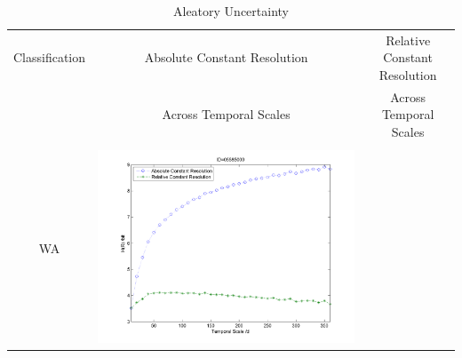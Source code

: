 \documentclass[11pt]{article}
\begin{document}
\begin{table}[H]\small
\caption{Aleatory Uncertainty}
\resizebox{\textwidth}{!}
{
\centering
\begin{tabular}{ccc}
\toprule
Classification& Absolute Constant Resolution & Relative Constant Resolution \\
& Across Temporal Scales & Across Temporal Scales\\\hline
\\
WA
&\begin{minipage}{.6\textwidth}\includegraphics[width=\linewidth]{resultgraph/e05585000.png}\end{minipage}


\end{tabular}}
\end{table}
\end{document}
